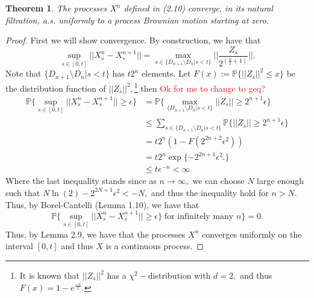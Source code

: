 \documentclass[openany, amssymb, psamsfonts]{amsart}
\newtheorem{thm}{Theorem}[section]
\theoremstyle{definition}
\numberwithin{equation}{section}
\newcommand{\bbP}{\mathbb{P}}
\newcommand{\sm}{\setminus}
\begin{document}
\begin{thm}
The processes $X^n$ defined in (2.10) converge, in its natural filtration, a.s. uniformly to a process Brownian motion starting at zero.
\end{thm}
\begin{proof}
First we will show convergence. By construction, we have that 
\[\sup\limits_{s\in [0,t]}||X_s^n - X_s^{n+1}|| = \max\limits_{s\in \{D_{n+1}\sm D_n | s<t\}}||\frac{Z_s}{2^{(\frac{n}{2} +1)}}||.\] Note that $\{D_{n+1}\sm D_n | s<t\}$ has $t2^n$ elements. Let $F(x):=\bbP\{||Z_s||^2 \leq x\}$ be the distribution function of $||Z_s||^2,$\footnote{It is known that $||Z_s||^2$ has a $\chi^2-$distribution with $d=2,$ and thus $F(x) = 1-e^{\frac{-x}{2}}.$} then
\textcolor{red}{Ok for me to change to geq?}
\begin{align*}
\bbP\{\sup\limits_{s\in [0,t]} ||X_s^n - X_s^{n+1}||\geq\epsilon\} &= \bbP\{\max\limits_{\{D_{n+1}\sm D_n | s<t\}} ||Z_s|| \geq2^{n+1}\epsilon\}\\
&\leq \sum_{s\in \{D_{n+1}\sm D_n | s<t\}} \bbP\{||Z_s||\geq 2^{n+1}\epsilon\}\\
&= t2^n(1-F(2^{2n+2}\epsilon^2))\\
&= t2^n \exp\{-2^{2n+1}\epsilon^2.\}\\
&\leq te^{-n}<\infty
\end{align*}
Where the last inequality stands since as $n\to \infty,$ we can choose $N$ large enough such that $N\ln(2) - 2^{2N+1}\epsilon^2<-N,$ and thus the inequality hold for $n>N.$ Thus, by Borel-Cantelli (Lemma 1.10), we have that 
\[\bbP\{\sup\limits_{s\in [0,t]} ||X_s^n - X_s^{n+1}||\geq\epsilon\} \; \text{for infinitely many $n$}\}=0.\] Thus, by Lemma 2.9, we have that the processes $X^n$ converges uniformly on the interval $[0,t]$ and thus $X$ is a continuous process.


\end{proof}
\end{document}
